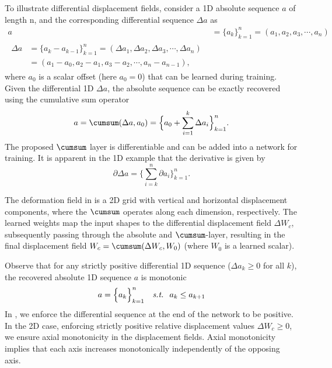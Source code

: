 \documentclass[acmtog,timestamp]{acmart}%
\begin{document}
To illustrate differential displacement fields, consider a 1D absolute sequence $a$ of length n, and the corresponding differential sequence $\Delta a$ as
\begin{subequations}
\begin{align}
a  & = \Big\{ a_k \Big\}_{k=1}^n  = ( a_1, a_2, a_3, \cdots, a_n ) \label{eq:oned_seq_abs}\\
\begin{split}
\Delta a & = \Big\{a_k - a_{k-1} \Big\}_{k=1}^n = ( \Delta a_1, \Delta a_2, \Delta a_3, \cdots, \Delta a_n )
\\
& = (a_1 - a_0, a_2 - a_1, a_3 - a_2,  \cdots, a_n - a_{n-1} ),
\end{split}
\label{eq:oned_seq_rel}
\end{align}
\end{subequations}
where $a_0$ is a scalar offset (here $a_0 = 0$) that can be learned during training. Given the differential 1D $\Delta a$, the absolute sequence can be exactly recovered using the cumulative sum operator
\begin{equation}
a = \cumsum( \Delta a ,a_0) = \Big\{ a_0 + \sum_{i=1}^k \Delta a_i \Big\}_{k=1}^n.
\label{eq:cumsum}
\end{equation}
The proposed $\cumsum$ layer is differentiable and can be added into a network for training. It is apparent in the 1D example that the derivative is given by
\begin{equation}
\partial \Delta a=\Big\{\sum_{i=k}^n \partial a_i  \Big\}_{k=1}^n.
\label{eq:cumsum_deriv}
\end{equation}%

The deformation field in \ourmethod{} is a 2D grid with vertical and horizontal displacement components, where the $\cumsum$ operates along each dimension, respectively. The learned \ourmethod{} weights map the input shapes to the differential displacement field $\Delta W_c$, subsequently passing through the absolute and $\cumsum$-layer, resulting in the final displacement field $W_c = \cumsum(\Delta W_c, W_0)$ (where $W_0$ is a learned scalar).

Observe that for any strictly positive differential 1D sequence ($\Delta a_k \geq 0$ for all $k$), the recovered absolute 1D sequence $a$ is monotonic
\begin{equation}
a   = \Big\{ a_k \Big\}_{k=1}^n \quad \text{\textit{s.t.}  } \; a_k \leq a_{k+1}
\label{eq:cumsum_mono}
\end{equation}%
In \ourmethod{}, we enforce the differential sequence at the end of the network to be positive. In the 2D case, enforcing strictly positive relative displacement values $\Delta W_c \geq 0$, we ensure axial monotonicity in the displacement fields. Axial monotonicity implies that each axis increases monotonically independently of the opposing axis.
\end{document}
